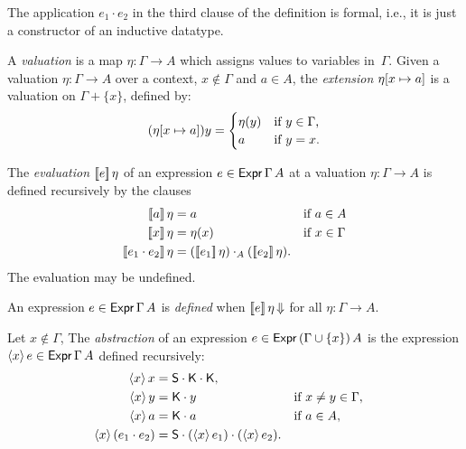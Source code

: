 \noindent
The application $e_1 \cdot e_2$ in the third clause of the definition is formal, i.e., it is just a constructor of an inductive datatype.

\begin{definition}
  \label{def:Valuation}%
  A \emph{valuation} is a map $\eta : \Gamma \to A$ which assigns values to variables in~$\Gamma$.
  Given a valuation $\eta : \Gamma \to A$ over a context, $x \not\in \Gamma$ and $a \in A$, the
  \emph{extension} $\eta[x \mapsto a]$ is a valuation on $\Gamma + \{x\}$, defined by:
  \begin{equation*}
    (\eta[x \mapsto a]) y =
    \begin{cases}
      \eta(y) &\text{if $y \in \Gamma$,}\\
      a       &\text{if $y = x$.}
    \end{cases}
  \end{equation*}
\end{definition}

\begin{definition}
  \label{def:Expr.eval}
  \leanok
  The \emph{evaluation} $[\![ e ]\!] \, \eta$ of an expression $e \in \mathsf{Expr}\,\Gamma\,A$ at a
  valuation $\eta : \Gamma \to A$ is defined recursively by the clauses
  \begin{align*}
    \eval{a}{\eta} &= a        &&\text{if $a \in A$}\\
    \eval{x}{\eta} &= \eta(x)  &&\text{if $x \in \Gamma$}\\
    \eval{e_1 \cdot e_2}{\eta} &= (\eval{e_1} \eta) \cdot_A (\eval{e_2} \eta).
  \end{align*}
  The evaluation may be undefined.
\end{definition}

\begin{definition}
  \label{def:Expr.defined}
  \leanok
  An expression $e \in \mathsf{Expr}\,\Gamma\,A$ is \emph{defined} when $[\![ e ]\!] \, \eta\,{\Downarrow}$
  for all $\eta : \Gamma \to A$.
\end{definition}


\begin{definition}
  \label{def:Expr.abstr}
  Let $x \not\in \Gamma$,
  The \emph{abstraction} of an expression $e \in \mathsf{Expr}\,(\Gamma \cup \{x\})\,A$ 
  is the expression $\langle x \rangle\, e \in \mathsf{Expr}\,\Gamma\,A$ defined recursively:
  \begin{align*}
    \langle x \rangle\, x &= \mathsf{S} \cdot \mathsf{K} \cdot \mathsf{K}, \\
    \langle x \rangle\, y &= \mathsf{K} \cdot y &&\text{if $x \neq y \in \Gamma$}, \\
    \langle x \rangle\, a &= \mathsf{K} \cdot a &&\text{if $a \in A$}, \\
    \langle x \rangle\, (e_1 \cdot e_2) &= \mathsf{S} \cdot (\langle x \rangle\, e_1) \cdot (\langle x \rangle\, e_2).
  \end{align*}
\end{definition}



